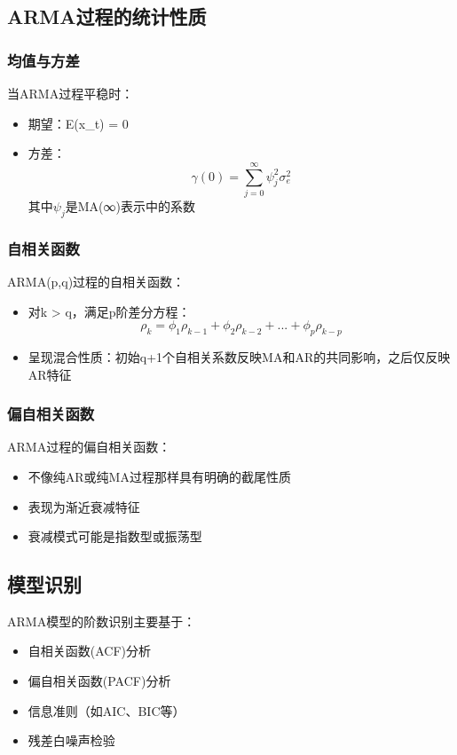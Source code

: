 \subsection{ARMA过程的统计性质}
\subsubsection{均值与方差}
当ARMA过程平稳时：
\begin{itemize}
    \item 期望：E(x_t) = 0
    \item 方差：\[\gamma(0) = \sum_{j=0}^{\infty}\psi_j^2\sigma_e^2\]
    其中\(\psi_j\)是MA(∞)表示中的系数
\end{itemize}

\subsubsection{自相关函数}
ARMA(p,q)过程的自相关函数：
\begin{itemize}
    \item 对k > q，满足p阶差分方程：
    \[\rho_k = \phi_1\rho_{k-1} + \phi_2\rho_{k-2} + ... + \phi_p\rho_{k-p}\]
    \item 呈现混合性质：初始q+1个自相关系数反映MA和AR的共同影响，之后仅反映AR特征
\end{itemize}

\subsubsection{偏自相关函数}
ARMA过程的偏自相关函数：
\begin{itemize}
    \item 不像纯AR或纯MA过程那样具有明确的截尾性质
    \item 表现为渐近衰减特征
    \item 衰减模式可能是指数型或振荡型
\end{itemize}

\subsection{模型识别}
ARMA模型的阶数识别主要基于：
\begin{itemize}
    \item 自相关函数(ACF)分析
    \item 偏自相关函数(PACF)分析
    \item 信息准则（如AIC、BIC等）
    \item 残差白噪声检验
\end{itemize}

